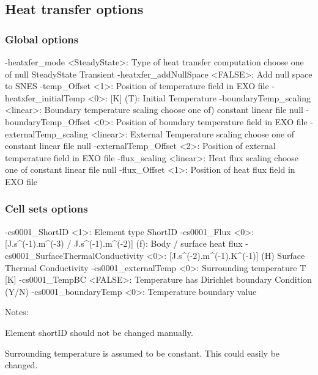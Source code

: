 \documentclass[10pt,oneside]{memoir}
\begin{document}
\subsection{Heat transfer options}
\subsubsection{Global options}
\small{\begin{boxedverbatim}
-heatxfer_mode <SteadyState>:   Type of heat transfer computation 
                                choose one of null SteadyState Transient
-heatxfer_addNullSpace <FALSE>: Add null space to SNES 
-temp_Offset <1>:               Position of temperature field in EXO file 
-heatxfer_initialTemp <0>:      [K] (T): Initial Temperature 
-boundaryTemp_scaling <linear>: Boundary temperature scaling 
                                choose one of)  constant linear file null
-boundaryTemp_Offset <0>:       Position of boundary temperature field in EXO file 
-externalTemp_scaling <linear>: External Temperature scaling 
                                choose one of constant linear file null
-externalTemp_Offset <2>:       Position of external temperature field in EXO file 
-flux_scaling <linear>:         Heat flux scaling 
                                choose one of constant linear file null
-flux_Offset <1>:               Position of heat flux field in EXO file 
\end{boxedverbatim}}

\subsubsection{Cell sets options}
\small{\begin{boxedverbatim}
-cs0001_ShortID <1>: Element type ShortID 
-cs0001_Flux <0>: [J.s^(-1).m^(-3) / J.s^(-1).m^(-2)] (f): Body / surface heat flux 
-cs0001_SurfaceThermalConductivity <0>: [J.s^(-2).m^(-1).K^(-1)]
                                        (H) Surface Thermal Conductivity 
-cs0001_externalTemp <0>: Surrounding temperature T [K] 
-cs0001_TempBC <FALSE>:   Temperature has Dirichlet boundary Condition (Y/N) 
-cs0001_boundaryTemp <0>: Temperature boundary value 
\end{boxedverbatim}}
Notes:
\begin{compactenum}
\item Element shortID should not be changed manually. 
\item Surrounding temperature is assumed to be constant. This could easily be changed.
\end{compactenum}
\end{document}
